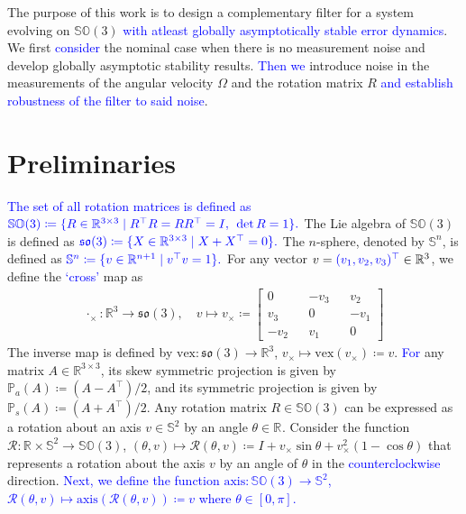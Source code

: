 \documentclass{article}
\title{\textblue{Hybrid Nonlinear Complementary Filters on $\SOthree$}}
\author{Piyush Jirwankar}
\date{\today}
\newcommand{\SOthree}{\mathbb{SO}(3)}
\newcommand{\sothree}{\mathfrak{so}(3)}
\newcommand{\axis}[1]{\text{axis}(#1)}
\newcommand{\R}[1]{\mathbb{R}^{#1}}
\newcommand{\vex}[1]{\text{vex}\left(#1\right)}
\newcommand{\textblue}[1]{\textcolor{blue}{#1}}
\newcommand{\cross}[1]{{#1}_\times}
\begin{document}
\maketitle

The purpose of this work is to {design a complementary filter} for a system evolving on $\SOthree$ \textblue{with atleast globally asymptotically stable error dynamics}. We first \textblue{consider} the nominal case when there is no measurement noise and develop globally asymptotic stability results. \textblue{Then we} introduce noise in the measurements of the angular velocity $\Omega$ and the rotation matrix $R$ \textblue{and establish robustness of the filter to said noise}. 

\section{Preliminaries}


\textblue{The set of all rotation matrices is defined as} $\textblue{\SOthree\coloneqq  \{R\in\R{3\times 3} \mid R^\top R = RR^\top = I,\:\: \det R = 1\}.}$ The Lie algebra of $\SOthree$ is defined as $\textblue{\sothree\coloneqq \{X\in\R{3\times 3}\mid X + X^\top = 0\}.}$
The $n$-sphere, denoted by $\mathbb{S}^n$, is defined as $\textblue{\mathbb{S}^n\coloneqq \{v\in \R{n+1}\mid v^\top v = 1\}.}$
For any vector $v = \textblue{(v_1, v_2, v_3)^\top}\in\R{3}$, we define the \textblue{`cross'} map as 
\begin{align}
    \cross{\cdot} : \R{3}\to \sothree, \quad v \mapsto \cross{v} \coloneqq \begin{bmatrix}
        0 && -v_3 && v_2\\
        v_3 && 0 && -v_1\\
        -v_2 && v_1 && 0
    \end{bmatrix}
\end{align}
The inverse map is defined by $\text{vex} : \sothree \to \R{3}$, $\cross{v} \mapsto \vex{\cross{v}}\coloneqq v$. \textblue{For} any matrix $A\in \R{3\times 3}$, its skew symmetric projection is given by $\mathbb{P}_a(A) \coloneqq (A - A^\top)/2$, and its symmetric projection is given by $\mathbb{P}_s(A) \coloneqq (A + A^\top)/2$. Any rotation matrix $R\in\SOthree$ can be expressed as a rotation about an axis $v\in\mathbb{S}^2$ by an angle $\theta\in\R{}$. Consider the function $\mathcal{R}:\R{}\times \mathbb{S}^2 \to \SOthree$, $(\theta, v)\mapsto \mathcal{R}(\theta, v)\coloneqq I + \cross{v}\sin\theta  + \cross{v}^2(1 - \cos{\theta})$ that represents a rotation about the axis $v$ by an angle of $\theta$ in the \textblue{counterclockwise} direction. \textblue{Next, we define the function $\text{axis} : \SOthree\to \mathbb{S}^2$, $\mathcal{R}(\theta, v)\mapsto \axis{\mathcal{R}(\theta, v)} \coloneqq v$ where $\theta\in [0,\pi]$.}
\end{document}
